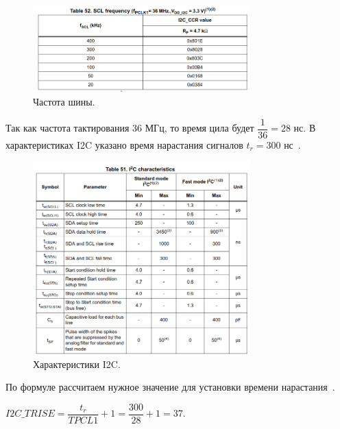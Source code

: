 	\begin{figure}[H]
    \centering
    \includegraphics[width=0.75\textwidth]{../image/i2c_ccr.png}
    \caption{Частота шины.}
	\end{figure}
	
	Так как частота тактирования 36 МГц, то время цила будет $\dfrac{1}{36}=28$ нс. В характеристиках I2C указано время нарастания сигналов $t_{r}=300$ нс~\cite{f103}.
	
	\begin{figure}[H]
    \centering
    \includegraphics[width=0.75\textwidth]{../image/i2c_rise.png}
    \caption{Характеристики I2C.}
	\end{figure}
	
	По формуле рассчитаем нужное значение для установки времени нарастания~\cite{czssd1306}.
	\begin{center}
	$I2C\_TRISE=\dfrac{t_{r}}{TPCL1}+1=\dfrac{300}{28}+1=37$.
	\end{center}

